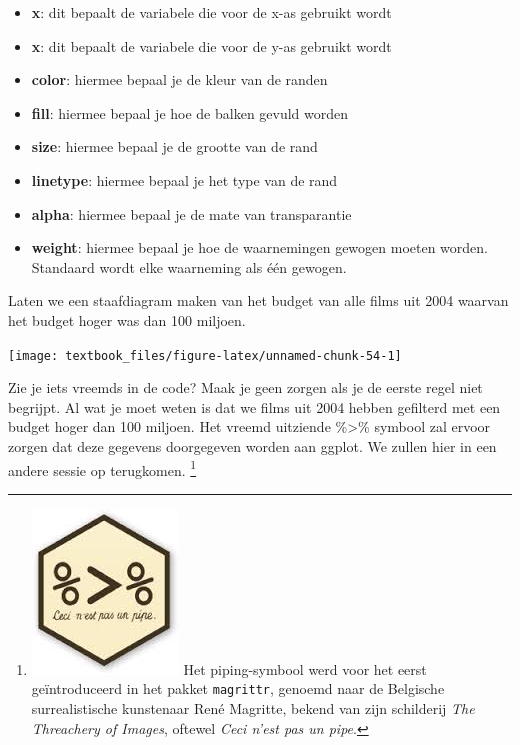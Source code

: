 \documentclass[]{tufte-book}
\newenvironment{Shaded}{}{}
\newcommand{\DecValTok}[1]{\textcolor[rgb]{0.25,0.63,0.44}{#1}}
\newcommand{\KeywordTok}[1]{\textcolor[rgb]{0.00,0.44,0.13}{\textbf{#1}}}
\newcommand{\NormalTok}[1]{#1}
\newcommand{\OperatorTok}[1]{\textcolor[rgb]{0.40,0.40,0.40}{#1}}
\newcommand{\StringTok}[1]{\textcolor[rgb]{0.25,0.44,0.63}{#1}}
\providecommand{\tightlist}{%
  \setlength{\itemsep}{0pt}\setlength{\parskip}{0pt}}
\begin{document}
\begin{itemize}
\tightlist
\item
  \textbf{x}: dit bepaalt de variabele die voor de x-as gebruikt wordt
\item
  \textbf{x}: dit bepaalt de variabele die voor de y-as gebruikt wordt
\item
  \textbf{color}: hiermee bepaal je de kleur van de randen
\item
  \textbf{fill}: hiermee bepaal je hoe de balken gevuld worden
\item
  \textbf{size}: hiermee bepaal je de grootte van de rand
\item
  \textbf{linetype}: hiermee bepaal je het type van de rand
\item
  \textbf{alpha}: hiermee bepaal je de mate van transparantie
\item
  \textbf{weight}: hiermee bepaal je hoe de waarnemingen gewogen moeten worden. Standaard wordt elke waarneming als één gewogen.
\end{itemize}

Laten we een staafdiagram maken van het budget van alle films uit 2004 waarvan het budget hoger was dan 100 miljoen.

\begin{Shaded}
\end{Shaded}

\texttt{[image: textbook\_files/figure-latex/unnamed-chunk-54-1]}

Zie je iets vreemds in de code? Maak je geen zorgen als je de eerste regel niet begrijpt. Al wat je moet weten is dat we films uit 2004 hebben gefilterd met een budget hoger dan 100 miljoen. Het vreemd uitziende \%\textgreater\% symbool zal ervoor zorgen dat deze gegevens doorgegeven worden aan ggplot. We zullen hier in een andere sessie op terugkomen. \footnote{\includegraphics{images/pipe.jpg} Het piping-symbool werd voor het eerst geïntroduceerd in het pakket \texttt{magrittr}, genoemd naar de Belgische surrealistische kunstenaar René Magritte, bekend van zijn schilderij \emph{The Threachery of Images}, oftewel \emph{Ceci n'est pas un pipe}.}
\end{document}
